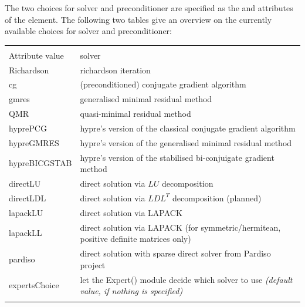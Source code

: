 The two choices for solver and preconditioner are specified as the 
and  attributes of the  element. The following two
tables give an overview on the currently available choices for solver and
preconditioner:
%
%
\begin{center}
\begin{tabular}{lp{}}
\hline\noalign{\smallskip}
\multicolumn{2}{c}{Currently available choices for \xml{type} attribute of
\xml{solver} element}\\
\noalign{\smallskip}\hline\noalign{\smallskip}
Attribute value & solver\\
\noalign{\smallskip}\hline\noalign{\smallskip}
Richardson    & richardson iteration\\
cg	      & (preconditioned) conjugate gradient algorithm\\
gmres	      & generalised minimal residual method\\
QMR	      & quasi-minimal residual method\\
hyprePCG      & hypre's version of the classical conjugate gradient algorithm\\
hypreGMRES    & hypre's version of the generalised minimal residual method\\
hypreBICGSTAB & hypre's version of the stabilised bi-conjuigate gradient
                method\\
\noalign{\smallskip}\hline\noalign{\smallskip}
directLU      & direct solution via $LU$ decomposition\\
directLDL     & direct solution via $LDL^T$ decomposition (planned)\\
lapackLU      & direct solution via LAPACK\\
lapackLL      & direct solution via LAPACK (for symmetric/hermitean, positive
                definite matrices only)\\
pardiso       & direct solution with sparse direct solver from Pardiso
                project\\
\noalign{\smallskip}\hline\noalign{\smallskip}
expertsChoice & let the Expert() module decide which solver to use
                \emph{(default value, if nothing is specified)}\\
\noalign{\smallskip}\hline
\end{tabular}
\end{center}
%
%
